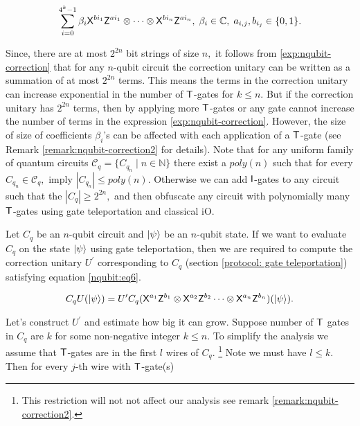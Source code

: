 \begin{equation}
\label{exp:nqubit-correction}
\sum_{i=0}^{4^k-1} \beta_i {\sf X}^{b{i_1}} {\sf Z}^{a{i_1}}\otimes \cdots \otimes {\sf X}^{b{i_n}} {\sf Z}^{a{i_n}},\; \beta_i\in\mathbb{C},\; a_{i,j},b_{i_j}\in\{0,1\}.
\end{equation}

Since, there are at most $2^{2n}$ bit strings of size $n,$ it follows from  \ref{exp:nqubit-correction} that for any $n$-qubit circuit the correction unitary can be written as a summation of at most $2^{2n}$ terms. This means the terms in the correction unitary can increase exponential in the number of ${\sf T}$-gates for $k\leq n.$ But if the correction unitary has $2^{2n}$ terms, then by applying more ${\sf T}$-gates or any gate cannot increase the number of terms in the expression \ref{exp:nqubit-correction}. However,  the size of size of coefficients $\beta_i$'s can be affected with each application of a ${\sf T}$-gate (see Remark \ref{remark:nqubit-correction2} for details). Note that for any uniform family of quantum circuits
$\mathcal{C}_q=\{C_{q_n}\mid n\in \mathbb{N}\}$ there exist a $poly(n)$ such that for every $C_{q_n}\in \mathcal{C}_q,$ imply $|C_{q_n}|\leq poly(n).$ Otherwise we can add ${\sf I}$-gates to any circuit such that the $|C_q|\geq 2^{2n},$ and then obfuscate any circuit with polynomially many ${\sf T}$-gates using gate teleportation and classical iO.


Let $C_q$ be an $n$-qubit circuit and ${\lvert}\psi\rangle$ be an $n$-qubit state. If we want to evaluate $C_q$ on the state ${\lvert}\psi\rangle$ using gate teleportation, then we are required to compute the correction unitary $U^\prime$ corresponding to $C_q$ (section \ref{protocol: gate  teleportation}) satisfying equation \ref{nqubit:eq6}.

\begin{equation}
\label{nqubit:eq6}
C_qU({\lvert}\psi\rangle)= U^\prime C_q ({\sf X}^{a_{1}}{\sf Z}^{b_{1}}\otimes {\sf X}^{a_{2}}{\sf Z}^{b_{2}}\cdots \otimes {\sf X}^{a_{n}}{\sf Z}^{b_{n}})({\lvert}\psi\rangle).
\end{equation}

Let's construct $U^\prime$ and estimate how big it can grow. Suppose number of ${\sf T}$ gates in $C_q$ are $k$ for some non-negative integer $k\leq n.$ To simplify the analysis we assume that ${\sf T}$-gates are in the first $l$ wires of $C_q.$ \footnote{This restriction will not not affect our analysis see  remark \ref{remark:nqubit-correction2}.} Note we must have $l\leq k.$ Then for every $j$-th wire with ${\sf T}$-gate(s)

